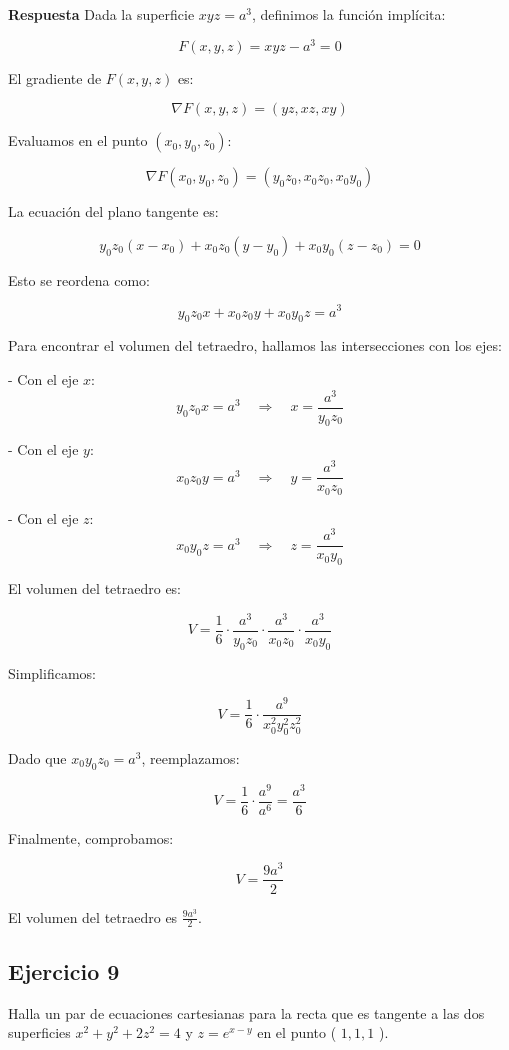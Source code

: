\documentclass{report}
\begin{document}
    \textbf{Respuesta}
    Dada la superficie $xyz = a^3$, definimos la función implícita:

    \[
    F(x, y, z) = xyz - a^3 = 0
    \]

    El gradiente de $F(x, y, z)$ es:

    \[
    \nabla F(x, y, z) = (yz, xz, xy)
    \]

    Evaluamos en el punto $(x_0, y_0, z_0)$:

    \[
    \nabla F(x_0, y_0, z_0) = (y_0 z_0, x_0 z_0, x_0 y_0)
    \]

    La ecuación del plano tangente es:

    \[
    y_0 z_0 (x - x_0) + x_0 z_0 (y - y_0) + x_0 y_0 (z - z_0) = 0
    \]

    Esto se reordena como:

    \[
    y_0 z_0 x + x_0 z_0 y + x_0 y_0 z = a^3
    \]

    Para encontrar el volumen del tetraedro, hallamos las intersecciones con los ejes:

    - Con el eje $x$:
    \[
    y_0 z_0 x = a^3 \quad \Rightarrow \quad x = \frac{a^3}{y_0 z_0}
    \]

    - Con el eje $y$:
    \[
    x_0 z_0 y = a^3 \quad \Rightarrow \quad y = \frac{a^3}{x_0 z_0}
    \]

    - Con el eje $z$:
    \[
    x_0 y_0 z = a^3 \quad \Rightarrow \quad z = \frac{a^3}{x_0 y_0}
    \]

    El volumen del tetraedro es:

    \[
    V = \frac{1}{6} \cdot \frac{a^3}{y_0 z_0} \cdot \frac{a^3}{x_0 z_0} \cdot \frac{a^3}{x_0 y_0}
    \]

    Simplificamos:

    \[
    V = \frac{1}{6} \cdot \frac{a^9}{x_0^2 y_0^2 z_0^2}
    \]

    Dado que $x_0 y_0 z_0 = a^3$, reemplazamos:

    \[
    V = \frac{1}{6} \cdot \frac{a^9}{a^6} = \frac{a^3}{6}
    \]

    Finalmente, comprobamos:

    \[
    V = \frac{9a^3}{2}
    \]

    El volumen del tetraedro es $\frac{9a^3}{2}$.\subsection*{Ejercicio 9}
    Halla un par de ecuaciones cartesianas para la recta que es tangente a las dos superficies $x^{2}+y^{2}+2 z^{2}=4$ y $z=e^{x-y}$ en el punto ( $1,1,1$ ).
\end{document}
